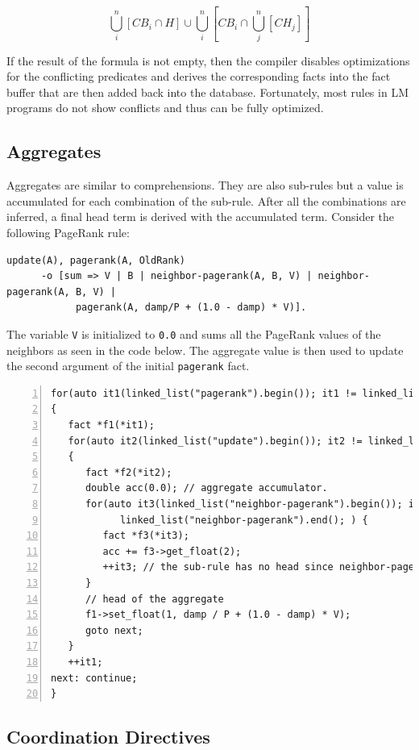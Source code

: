 \[
\bigcup^{n}_i[CB_i \cap H] \cup \bigcup^{n}_i [CB_i \cap \bigcup^{n}_j[CH_j]]
\]

If the result of the formula is not empty, then the compiler disables
optimizations for the conflicting predicates and derives the corresponding facts
into the fact buffer that are then added back into the database.
Fortunately, most rules in LM programs do not show conflicts and thus
can be fully optimized.

\subsection{Aggregates}

Aggregates are similar to comprehensions. They are also sub-rules but a value is
accumulated for each combination of the sub-rule. After all the combinations are
inferred, a final head term is derived with the accumulated term. Consider the following
PageRank rule:

\begin{Verbatim}[fontsize=\codesize]
update(A), pagerank(A, OldRank)
      -o [sum => V | B | neighbor-pagerank(A, B, V) | neighbor-pagerank(A, B, V) |
            pagerank(A, damp/P + (1.0 - damp) * V)].
\end{Verbatim}

The variable \texttt{V} is initialized to \texttt{0.0} and sums all
the PageRank values of the neighbors as seen in the code below. The aggregate
value is then used to update the second argument of the initial
\texttt{pagerank} fact.

\begin{Verbatim}[numbers=left,fontsize=\codesize]
for(auto it1(linked_list("pagerank").begin()); it1 != linked_list("pagerank").end(); )
{
   fact *f1(*it1);
   for(auto it2(linked_list("update").begin()); it2 != linked_list("update").end(); )
   {
      fact *f2(*it2);
      double acc(0.0); // aggregate accumulator.
      for(auto it3(linked_list("neighbor-pagerank").begin()); it3 !=
            linked_list("neighbor-pagerank").end(); ) {
         fact *f3(*it3);
         acc += f3->get_float(2);
         ++it3; // the sub-rule has no head since neighbor-pagerank is re-derived
      }
      // head of the aggregate
      f1->set_float(1, damp / P + (1.0 - damp) * V);
      goto next;
   }
   ++it1;
next: continue;
}
\end{Verbatim}

\subsection{Coordination Directives}


